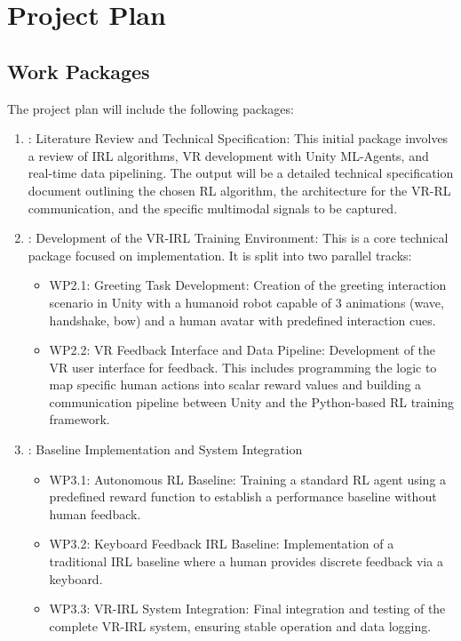 \documentclass[rnd]{mas_proposal}
\begin{document}
\section{Project Plan}

\subsection{Work Packages}
The project plan will include the following packages:
\begin{enumerate}
    \item [WP1]: Literature Review and Technical Specification: This initial package involves a review of IRL algorithms, VR development with Unity ML-Agents, and real-time data pipelining. The output will be a detailed technical specification document outlining the chosen RL algorithm, the architecture for the VR-RL communication, and the specific multimodal signals to be captured.
    \item [WP2]: Development of the VR-IRL Training Environment: This is a core technical package focused on implementation. It is split into two parallel tracks:
    \begin{itemize}
        \item WP2.1: Greeting Task Development: Creation of the greeting interaction scenario in Unity with a humanoid robot capable of 3 animations (wave, handshake, bow) and a human avatar with predefined interaction cues.
        \item WP2.2: VR Feedback Interface and Data Pipeline: Development of the VR user interface for feedback. This includes programming the logic to map specific human actions into scalar reward values and building a communication pipeline between Unity and the Python-based RL training framework.
    \end{itemize}
    \item [WP3]: Baseline Implementation and System Integration
        \begin{itemize}
        \item WP3.1: Autonomous RL Baseline: Training a standard RL agent using a predefined reward function to establish a performance baseline without human feedback.
        \item WP3.2: Keyboard Feedback IRL Baseline: Implementation of a traditional IRL baseline where a human provides discrete feedback via a keyboard.
        \item WP3.3: VR-IRL System Integration: Final integration and testing of the complete VR-IRL system, ensuring stable operation and data logging.

\end{itemize}
\end{enumerate}
\end{document}
